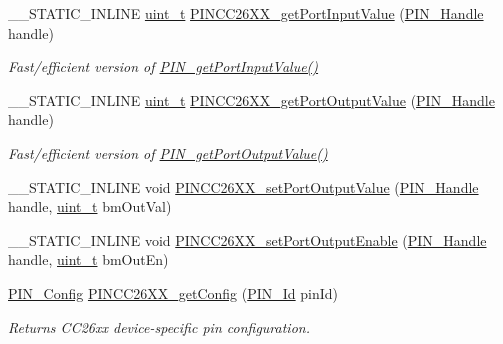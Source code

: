 \begin{DoxyCompactItemize}
\item 
\-\_\-\-\_\-\-S\-T\-A\-T\-I\-C\-\_\-\-I\-N\-L\-I\-N\-E \hyperlink{_p_i_n_8h_a12a1e9b3ce141648783a82445d02b58d}{uint\-\_\-t} \hyperlink{_p_i_n_c_c26_x_x_8h_a3fb51a5114db99572739e97b1577f5b8}{P\-I\-N\-C\-C26\-X\-X\-\_\-get\-Port\-Input\-Value} (\hyperlink{_p_i_n_8h_afb2de52b054638f63c39df1f30a0d88d}{P\-I\-N\-\_\-\-Handle} handle)
\begin{DoxyCompactList}\small\item\em Fast/efficient version of \hyperlink{_p_i_n_8h_a726e06dcb7c0d096efaee431ae7b2aaa}{P\-I\-N\-\_\-get\-Port\-Input\-Value()} \end{DoxyCompactList}\item 
\-\_\-\-\_\-\-S\-T\-A\-T\-I\-C\-\_\-\-I\-N\-L\-I\-N\-E \hyperlink{_p_i_n_8h_a12a1e9b3ce141648783a82445d02b58d}{uint\-\_\-t} \hyperlink{_p_i_n_c_c26_x_x_8h_ad9634c4a5c56298cdb2b26692f480ebe}{P\-I\-N\-C\-C26\-X\-X\-\_\-get\-Port\-Output\-Value} (\hyperlink{_p_i_n_8h_afb2de52b054638f63c39df1f30a0d88d}{P\-I\-N\-\_\-\-Handle} handle)
\begin{DoxyCompactList}\small\item\em Fast/efficient version of \hyperlink{_p_i_n_8h_ae7dedbfc51ba785bb2f546eed5fdd806}{P\-I\-N\-\_\-get\-Port\-Output\-Value()} \end{DoxyCompactList}\item 
\-\_\-\-\_\-\-S\-T\-A\-T\-I\-C\-\_\-\-I\-N\-L\-I\-N\-E void \hyperlink{_p_i_n_c_c26_x_x_8h_ada70a4225a699f50d8ccc15043dc64e7}{P\-I\-N\-C\-C26\-X\-X\-\_\-set\-Port\-Output\-Value} (\hyperlink{_p_i_n_8h_afb2de52b054638f63c39df1f30a0d88d}{P\-I\-N\-\_\-\-Handle} handle, \hyperlink{_p_i_n_8h_a12a1e9b3ce141648783a82445d02b58d}{uint\-\_\-t} bm\-Out\-Val)
\item 
\-\_\-\-\_\-\-S\-T\-A\-T\-I\-C\-\_\-\-I\-N\-L\-I\-N\-E void \hyperlink{_p_i_n_c_c26_x_x_8h_a37faf5e394a2683e5ffa8a609cda70d5}{P\-I\-N\-C\-C26\-X\-X\-\_\-set\-Port\-Output\-Enable} (\hyperlink{_p_i_n_8h_afb2de52b054638f63c39df1f30a0d88d}{P\-I\-N\-\_\-\-Handle} handle, \hyperlink{_p_i_n_8h_a12a1e9b3ce141648783a82445d02b58d}{uint\-\_\-t} bm\-Out\-En)
\item 
\hyperlink{_p_i_n_8h_ae427b7d2925f9b0f3145e455cfdb5841}{P\-I\-N\-\_\-\-Config} \hyperlink{_p_i_n_c_c26_x_x_8h_aef985455a19581bdb47fff4314fc318b}{P\-I\-N\-C\-C26\-X\-X\-\_\-get\-Config} (\hyperlink{_p_i_n_8h_a9ae8197f460bb76ea09a84f47d09921f}{P\-I\-N\-\_\-\-Id} pin\-Id)
\begin{DoxyCompactList}\small\item\em Returns C\-C26xx device-\/specific pin configuration. \end{DoxyCompactList}\item 

\end{DoxyCompactItemize}
